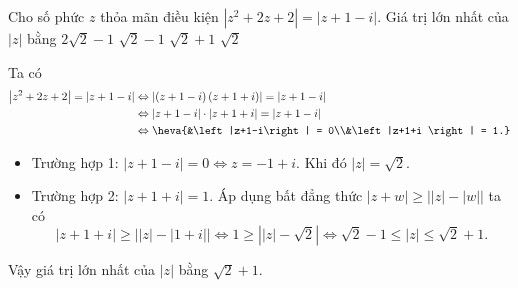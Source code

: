 \begin{ex}%
Cho số phức $z$ thỏa mãn điều kiện $\left|z^2+2 z+2\right|=|z+1-i|$. Giá trị lớn nhất của $|z|$ bằng
\choice
{$2 \sqrt{2}-1$}
{$\sqrt{2}-1$}
{\True $\sqrt{2}+1$}
{$\sqrt{2}$}
\loigiai
{
Ta có \[
\begin{aligned}
\left|z^2+2 z+2\right|=\left|z+1-i\right| &\Leftrightarrow \left|\left(z+1-i\right)\left(z+1+i\right)\right| = \left|z+1-i\right|\\
& \Leftrightarrow\left|z+1-i \right|\cdot\left|z+1+i \right| = \left|z+1-i\right|\\
& \Leftrightarrow \heva{&\left|z+1-i\right| = 0\\&\left|z+1+i \right| = 1.}
\end{aligned}
\]
\begin{itemize}
\item Trường hợp 1: $\left|z+1-i \right| = 0 \Leftrightarrow z = -1 + i$. Khi đó $\left|z \right| = \sqrt{2}$.
\item Trường hợp 2: $\left|z+1+i \right| = 1$. Áp dụng bất đẳng thức $\left|z+w \right|\ge \left|\left| z\right|-\left|w \right|\right|$ ta có
\[\left| z+1+i\right|\ge \left|\left|z \right|-\left|1+i \right|\right|  \Leftrightarrow 1\ge \left|\left| z\right| - \sqrt{2}\right| \Leftrightarrow \sqrt{2}-1\le \left| z\right| \le \sqrt{2}+1.\]
\end{itemize}
Vậy giá trị lớn nhất của $|z|$ bằng $\sqrt{2}+1$.
}
\end{ex}

